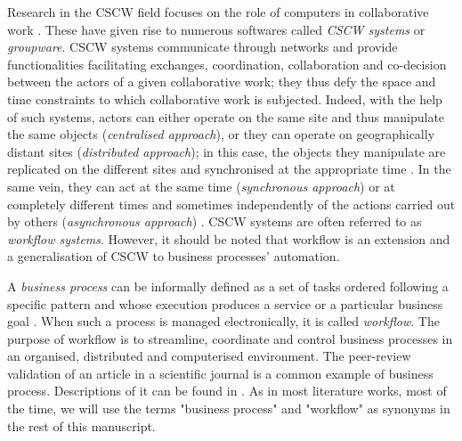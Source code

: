 \label{chap1:sec:bpm-def-key-principles}

\label{chap1:sec:bpm-def-history}
Research in the CSCW field focuses on the role of computers in collaborative work \cite{schimdt1992taking}. These have given rise to numerous softwares called \textit{CSCW systems} or \textit{groupware}. CSCW systems communicate through networks and provide functionalities facilitating exchanges, coordination, collaboration and co-decision between the actors of a given collaborative work; they thus defy the space and time constraints to which collaborative work is subjected. Indeed, with the help of such systems, actors can either operate on the same site and thus manipulate the same objects (\textit{centralised approach}), or they can operate on geographically distant sites (\textit{distributed approach}); in this case, the objects they manipulate are replicated on the different sites and synchronised at the appropriate time \cite{johansen1988groupware, grudin1994computer, penichet2007classification}. In the same vein, they can act at the same time (\textit{synchronous approach}) or at completely different times and sometimes independently of the actions carried out by others (\textit{asynchronous approach}) \cite{johansen1988groupware, grudin1994computer, penichet2007classification}. 
CSCW systems are often referred to as \textit{workflow systems}. However, it should be noted that workflow is an extension and a generalisation of CSCW to business processes' automation.

\label{chap1:sec:bpm-basic-concepts-def}
A \textit{business process} can be informally defined as a set of tasks ordered following a specific pattern and whose execution produces a service or a particular business goal \cite{workflow95}. When such a process is managed electronically, it is called \textit{workflow}. The purpose of workflow is to streamline, coordinate and control business processes in an organised, distributed and computerised environment. The peer-review validation of an article in a scientific journal is a common example of business process. Descriptions of it can be found in \cite{peerReview02, van2001proclets, badouel14}. As in most literature works, most of the time, we will use the terms "business process" and "workflow" as synonyms in the rest of this manuscript.

